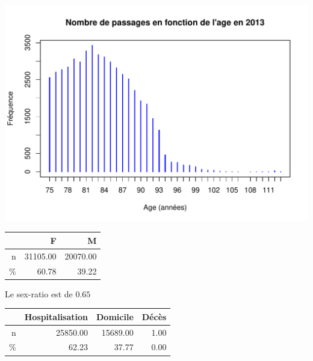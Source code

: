 \documentclass[12pt,english,french,twoside]{report}\usepackage[]{graphicx}\usepackage[]{color}
\makeatletter
\def\maxwidth{ %
  \ifdim\Gin@nat@width>\linewidth
    \linewidth
  \else
    \Gin@nat@width
  \fi
}
\newenvironment{knitrout}{}{} %
\makeatother
\begin{document}

\begin{knitrout}
\color{fgcolor}
\includegraphics[width=\maxwidth]{figure/passages_geriatrie} 

\end{knitrout}



\begin{table}[ht]
\centering
\begin{tabular}{rrr}
  \hline
 & F & M \\ 
  \hline
n & 31105.00 & 20070.00 \\ 
  \% & 60.78 & 39.22 \\ 
   \hline
\end{tabular}
\end{table}




Le sex-ratio est de $0.65$


\begin{table}[ht]
\centering
\begin{tabular}{rrrr}
  \hline
 & Hospitalisation & Domicile & Décès \\ 
  \hline
n & 25850.00 & 15689.00 & 1.00 \\ 
  \% & 62.23 & 37.77 & 0.00 \\ 
   \hline
\end{tabular}
\end{table}
\end{document}
